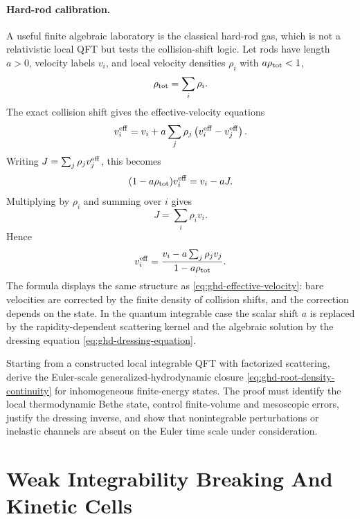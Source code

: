 \paragraph{Hard-rod calibration.}
A useful finite algebraic laboratory is the classical hard-rod gas, which is
not a relativistic local QFT but tests the collision-shift logic.  Let rods
have length \(a>0\), velocity labels \(v_i\), and local velocity densities
\(\rho_i\) with \(a\rho_{\rm tot}<1\),
\[
  \rho_{\rm tot}=\sum_i\rho_i .
\]
The exact collision shift gives the effective-velocity equations
\begin{equation}
  v_i^{\rm eff}
  =
  v_i
  +
  a\sum_j\rho_j
  \left(v_i^{\rm eff}-v_j^{\rm eff}\right).
  \label{eq:hard-rod-effective-velocity-equation}
\end{equation}
Writing \(J=\sum_j\rho_jv_j^{\rm eff}\), this becomes
\[
  (1-a\rho_{\rm tot})v_i^{\rm eff}=v_i-aJ.
\]
Multiplying by \(\rho_i\) and summing over \(i\) gives
\[
  J=\sum_i\rho_iv_i .
\]
Hence
\begin{equation}
  v_i^{\rm eff}
  =
  \frac{v_i-a\sum_j\rho_jv_j}{1-a\rho_{\rm tot}} .
  \label{eq:hard-rod-effective-velocity-solution}
\end{equation}
The formula displays the same structure as
\eqref{eq:ghd-effective-velocity}: bare velocities are corrected by the
finite density of collision shifts, and the correction depends on the state.
In the quantum integrable case the scalar shift \(a\) is replaced by the
rapidity-dependent scattering kernel and the algebraic solution by the
dressing equation \eqref{eq:ghd-dressing-equation}.

\begin{openproblem}
\label{op:ghd-from-local-integrable-qft}
Starting from a constructed local integrable QFT with factorized scattering,
derive the Euler-scale generalized-hydrodynamic closure
\eqref{eq:ghd-root-density-continuity} for inhomogeneous finite-energy
states.  The proof must identify the local thermodynamic Bethe state, control
finite-volume and mesoscopic errors, justify the dressing inverse, and show
that nonintegrable perturbations or inelastic channels are absent on the
Euler time scale under consideration.
\end{openproblem}

\section{Weak Integrability Breaking And Kinetic Cells}
\label{sec:tba-weak-breaking-kinetic-cells}

